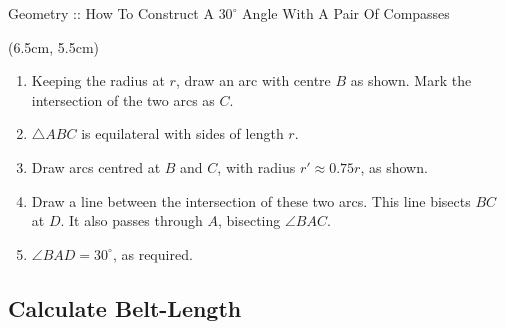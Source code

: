 \documentclass[8pt,xcolor={svgnames, x11names}]{beamer}
\begin{document}
\begin{frame}{Geometry :: How To Construct A $30^\circ$ Angle With A Pair Of Compasses}
\begin{textblock*}{0.55\textwidth}
	\end{textblock*}

	\begin{textblock*}{0.55\textwidth}(6.5cm, 5.5cm)
		
		\begin{enumerate}
			\resume
			\item<4-8 | alert@4> Keeping the radius at $r$, draw an arc with centre $B$ as shown. Mark the intersection of the two arcs as $C$.
			\item<5-8 | alert@5> $\triangle ABC$ is equilateral with sides of length $r$.
			\item<6-8 | alert@6> Draw arcs centred at $B$ and $C$, with radius $r'\approx 0.75r$, as shown.
			\item<7-8 | alert@7> Draw a line between the intersection of these two arcs. This line bisects $BC$ at $D$. It also passes through $A$, bisecting $\angle BAC$.
			\item<8 | alert@8> $\angle BAD = 30^\circ$, as required.
			\suspend
		\end{enumerate}
	
	\end{textblock*}
	
\end{frame}

\subsection{Calculate Belt-Length}
\end{document}
